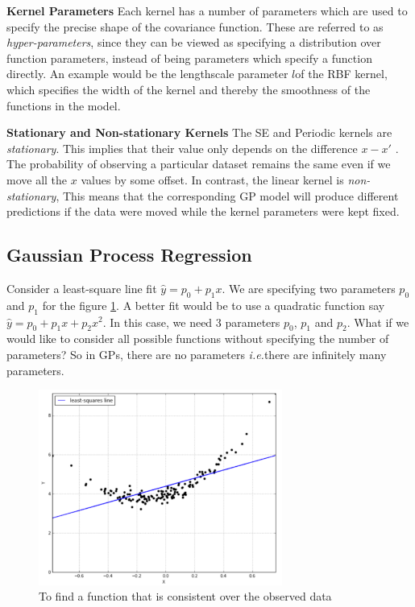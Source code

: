 \documentclass[12pt]{report}
\newcommand{\ie}{\textit{i.e.}}
\begin{document}
\cite{rasmussen2003gaussian}

\textbf{Kernel Parameters} Each kernel has a number of parameters which are used to specify the precise shape of the covariance function. These are referred to as \textit{hyper-parameters}, since they can be viewed as specifying a distribution over function parameters, instead of being parameters which specify a function directly. 
An example would be the lengthscale parameter $l$of the RBF kernel, which specifies the width of the kernel and thereby the smoothness of the functions in the model.

\textbf{Stationary and Non-stationary Kernels} The SE and Periodic kernels are \textit{stationary}. This implies that their value only depends on the difference $x − x'$ . The probability of observing a particular dataset remains the same even if we move all the $x$ values by some offset. In contrast, the linear kernel is \textit{non-stationary}, This means that the corresponding GP model will produce different predictions if the data were moved while the kernel parameters were kept fixed.

\subsection{Gaussian Process Regression}
Consider a least-square line fit  $\hat{y} = p_0 + p_1x$. We are specifying two parameters $p_0$ and $p_1$ for the figure \ref{fig:lease_square}. A better fit would be to use a quadratic function say $\hat{y} = p_0 + p_1x + p_2x^2$. In this case, we need $3$ parameters $p_0$, $p_1$ and $p_2$. What if we would like to consider all possible functions without specifying the number of parameters? So in GPs, there are no parameters \ie there are infinitely many parameters. \par
\begin{figure}[htp]
	\centering 
	\includegraphics[width=8cm]{ls_fit.pdf}
	\caption{To find a function that is consistent over the observed data}
   \label{fig:lease_square}
\end{figure}
\end{document}

